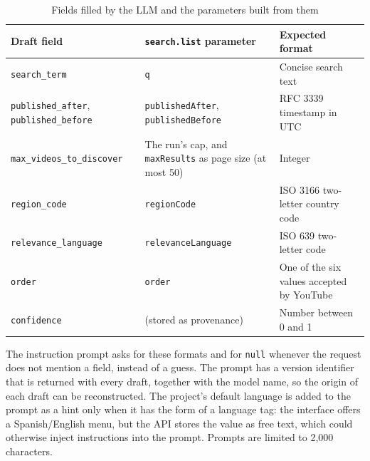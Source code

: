 \begingroup
{}
\begin{table}[htbp]
    \centering
    \footnotesize
    \caption{Fields filled by the LLM and the parameters built from them}
    \label{tab:llm_draft_fields}
    \begin{tabularx}
        {\textwidth}{>{\raggedright\arraybackslash}p{4.2cm}>{\raggedright\arraybackslash}p{4.4cm}X}
        \toprule
        \textbf{Draft field}                                  & \textbf{\texttt{search.\allowbreak list} parameter}              & \textbf{Expected format}                  \\
        \midrule
        \texttt{search\_term}                                 & \texttt{q}                                                       & Concise search text                       \\
        \texttt{published\_after}, \texttt{published\_before} & \texttt{publishedAfter}, \texttt{publishedBefore}                & RFC 3339 timestamp in UTC                 \\
        \texttt{max\_videos\_to\_discover}                    & The run's cap, and \texttt{maxResults} as page size (at most 50) & Integer                                   \\
        \texttt{region\_code}                                 & \texttt{regionCode}                                              & ISO 3166 two-letter country code          \\
        \texttt{relevance\_language}                          & \texttt{relevanceLanguage}                                       & ISO 639 two-letter code                   \\
        \texttt{order}                                        & \texttt{order}                                                   & One of the six values accepted by YouTube \\
        \texttt{confidence}                                   & (stored as provenance)                                           & Number between 0 and 1                    \\
        \bottomrule
    \end{tabularx}
\end{table}
\endgroup

The instruction prompt asks for these formats and for \texttt{null} whenever the request does not mention a field, instead of a guess. The prompt has a version identifier that is returned with every draft, together with the model name, so the origin of each draft can be reconstructed. The project's default language is added to the prompt as a hint only when it has the form of a language tag: the interface offers a Spanish/English menu, but the API stores the value as free text, which could otherwise inject instructions into the prompt. Prompts are limited to 2,000 characters.

